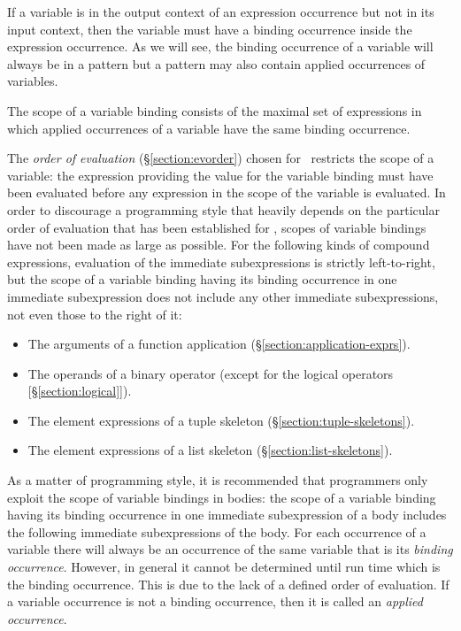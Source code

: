 If a variable is in the output context of an expression occurrence but
not in its input context, then the variable must have a binding
occurrence inside the expression occurrence.  As we will see, the
binding occurrence of a variable will always be in a pattern but a
pattern may also contain applied occurrences of variables.

The scope of a variable binding consists of the maximal set of expressions in
which applied occurrences of a variable have the same binding occurrence.

The \emph{order of evaluation}
(\S\ref{section:evorder}) chosen for
\StdErlang\ restricts the scope of a variable: the expression providing
the value for the variable binding must have been evaluated before any
expression in the scope of the variable is evaluated.  In order to
discourage a programming style that heavily depends on the particular
order of evaluation that has been established for \StdErlang, scopes
of variable bindings have not been made as large as possible.  For the
following kinds of compound expressions, evaluation of the immediate
subexpressions is strictly left-to-right, but the scope of a variable
binding having its binding occurrence in one immediate subexpression
does not include any other immediate subexpressions, not even those to
the right of it:
\begin{itemize}
\item The arguments of a function application
(\S\ref{section:application-exprs}).
\item The operands of a binary operator (except for the logical
operators [\S\ref{section:logical}]). 
\item The element expressions of a tuple skeleton
(\S\ref{section:tuple-skeletons}).
\item The element expressions of a list skeleton
(\S\ref{section:list-skeletons}).
\end{itemize}

As a matter of programming style, it is recommended that programmers
only exploit the scope of variable bindings in bodies: the scope of a
variable binding having its binding occurrence in one immediate
subexpression of a body includes the following immediate
subexpressions of the body.
\fi
\ifOld
For each occurrence of a variable there will always be an occurrence
of the same variable that is its \emph{binding
occurrence}.  However, in general
it cannot be determined until run time which is the binding
occurrence.  This is due to the lack of a defined order of evaluation.
If a variable occurrence is not a binding occurrence, then it is
called an \emph{applied occurrence}.

